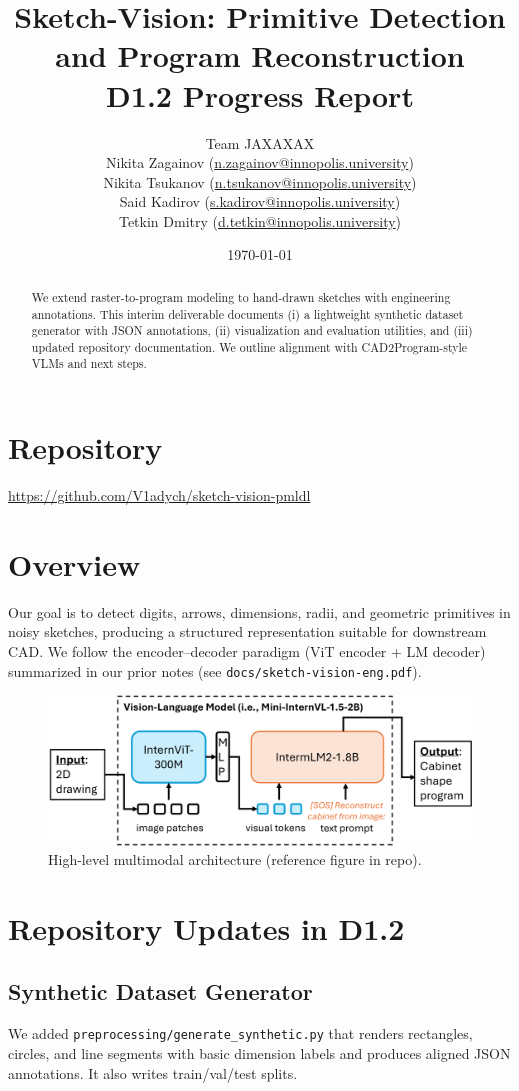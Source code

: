 \documentclass[11pt,a4paper]{article}
\title{Sketch-Vision: Primitive Detection and Program Reconstruction\\\large D1.2 Progress Report}
\author{Team JAXAXAX \\[4pt]
  Nikita Zagainov (\href{mailto:n.zagainov@innopolis.university}{n.zagainov@innopolis.university}) \\
  Nikita Tsukanov (\href{mailto:n.tsukanov@innopolis.university}{n.tsukanov@innopolis.university}) \\
  Said Kadirov (\href{mailto:s.kadirov@innopolis.university}{s.kadirov@innopolis.university}) \\
  Tetkin Dmitry (\href{mailto:d.tetkin@innopolis.university}{d.tetkin@innopolis.university})
}
\date{\today}
\begin{document}
\maketitle

\begin{abstract}
We extend raster-to-program modeling to hand-drawn sketches with engineering annotations. This interim deliverable documents (i) a lightweight synthetic dataset generator with JSON annotations, (ii) visualization and evaluation utilities, and (iii) updated repository documentation. We outline alignment with CAD2Program-style VLMs and next steps.
\end{abstract}

\section{Repository}
\url{https://github.com/V1adych/sketch-vision-pmldl}

\section{Overview}
Our goal is to detect digits, arrows, dimensions, radii, and geometric primitives in noisy sketches, producing a structured representation suitable for downstream CAD. We follow the encoder--decoder paradigm (ViT encoder + LM decoder) summarized in our prior notes (see \texttt{docs/sketch-vision-eng.pdf}).

\begin{figure}[!htbp]
  \centering
  \includegraphics[width=0.9\linewidth]{internvl.png}
  \caption{High-level multimodal architecture (reference figure in repo).}\label{fig:internvl}
\end{figure}

\section{Repository Updates in D1.2}
\subsection{Synthetic Dataset Generator}
We added \texttt{preprocessing/generate\_synthetic.py} that renders rectangles, circles, and line segments with basic dimension labels and produces aligned JSON annotations. It also writes train/val/test splits.
\end{document}
